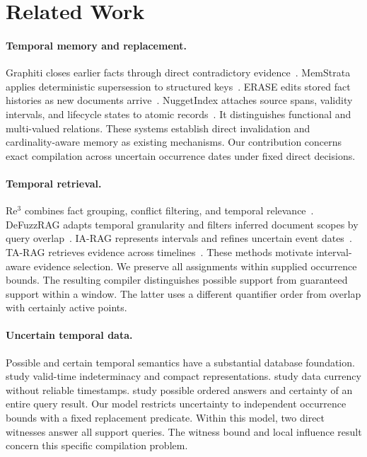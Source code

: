 \section{Related Work}
\label{sec:related}

\paragraph{Temporal memory and replacement.}
Graphiti closes earlier facts through direct contradictory evidence~\citep{rasmussen2025zep,graphiti2026source}.
MemStrata applies deterministic supersession to structured keys~\citep{yadav2026memstrata}.
ERASE edits stored fact histories as new documents arrive~\citep{li2025erase}.
NuggetIndex attaches source spans, validity intervals, and lifecycle states to atomic records~\citep{zerhoudi2026nuggetindex}.
It distinguishes functional and multi-valued relations.
These systems establish direct invalidation and cardinality-aware memory as existing mechanisms.
Our contribution concerns exact compilation across uncertain occurrence dates under fixed direct decisions.

\paragraph{Temporal retrieval.}
Re$^3$ combines fact grouping, conflict filtering, and temporal relevance~\citep{cao2026re3}.
DeFuzzRAG adapts temporal granularity and filters inferred document scopes by query overlap~\citep{chen2026defuzzrag}.
IA-RAG represents intervals and refines uncertain event dates~\citep{wang2026iarag}.
TA-RAG retrieves evidence across timelines~\citep{lau2025tarag}.
These methods motivate interval-aware evidence selection.
We preserve all assignments within supplied occurrence bounds.
The resulting compiler distinguishes possible support from guaranteed support within a window.
The latter uses a different quantifier order from overlap with certainly active points.

\paragraph{Uncertain temporal data.}
Possible and certain temporal semantics have a substantial database foundation.
\citet{anselma2013indeterminacy} study valid-time indeterminacy and compact representations.
\citet{fan2012currency} study data currency without reliable timestamps.
\citet{amarilli2017order} study possible ordered answers and certainty of an entire query result.
Our model restricts uncertainty to independent occurrence bounds with a fixed replacement predicate.
Within this model, two direct witnesses answer all support queries.
The witness bound and local influence result concern this specific compilation problem.

